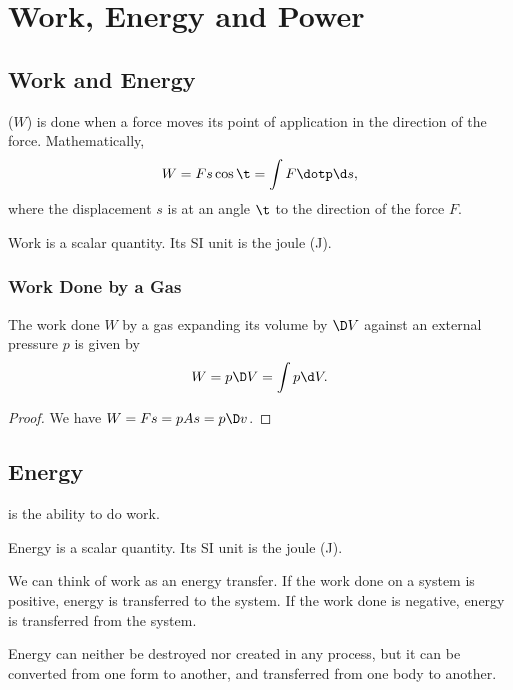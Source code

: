 \chapter{Work, Energy and Power}

\section{Work and Energy}

\begin{definition}
     ($W$) is done when a force moves its point of application in the direction of the force. Mathematically, \[W = F s \cos \t = \int F \dotp \d s,\] where the displacement $s$ is at an angle $\t$ to the direction of the force $F$.
\end{definition}

Work is a scalar quantity. Its SI unit is the joule (J).

\subsection{Work Done by a Gas}

\begin{proposition}
    The work done $W$ by a gas expanding its volume by $\D V$ against an external pressure $p$ is given by \[W = p \D V = \int p \d V.\]
\end{proposition}
\begin{proof}
    We have $W = F s = p A s = p \D v$.
\end{proof}

\section{Energy}

\begin{definition}
     is the ability to do work.
\end{definition}

Energy is a scalar quantity. Its SI unit is the joule (J).

We can think of work as an energy transfer. If the work done on a system is positive, energy is transferred to the system. If the work done is negative, energy is transferred from the system.

\begin{law}
    Energy can neither be destroyed nor created in any process, but it can be converted from one form to another, and transferred from one body to another.
\end{law}

